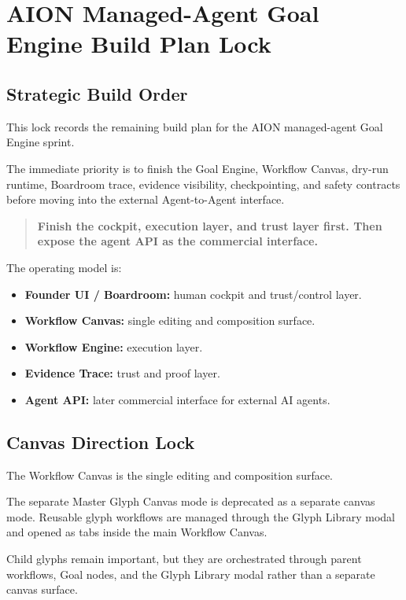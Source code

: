 \section{AION Managed-Agent Goal Engine Build Plan Lock}
\label{sec:aion-managed-agent-goal-engine-build-plan-lock}

\subsection{Strategic Build Order}

This lock records the remaining build plan for the AION managed-agent Goal Engine sprint.

The immediate priority is to finish the Goal Engine, Workflow Canvas, dry-run runtime, Boardroom trace, evidence visibility, checkpointing, and safety contracts before moving into the external Agent-to-Agent interface.

\begin{quote}
\textbf{Finish the cockpit, execution layer, and trust layer first. Then expose the agent API as the commercial interface.}
\end{quote}

The operating model is:

\begin{itemize}
  \item \textbf{Founder UI / Boardroom:} human cockpit and trust/control layer.
  \item \textbf{Workflow Canvas:} single editing and composition surface.
  \item \textbf{Workflow Engine:} execution layer.
  \item \textbf{Evidence Trace:} trust and proof layer.
  \item \textbf{Agent API:} later commercial interface for external AI agents.
\end{itemize}

\subsection{Canvas Direction Lock}

The Workflow Canvas is the single editing and composition surface.

The separate Master Glyph Canvas mode is deprecated as a separate canvas mode. Reusable glyph workflows are managed through the Glyph Library modal and opened as tabs inside the main Workflow Canvas.

Child glyphs remain important, but they are orchestrated through parent workflows, Goal nodes, and the Glyph Library modal rather than a separate canvas surface.

